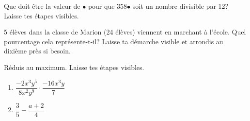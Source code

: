 \documentclass[12pt,parskip=half-, twoside=semi]{scrartcl}
\begin{document}
\begin{exercise}[points=3]
	Que doit être la valeur de $\bullet$ pour que 358$\bullet$ soit un nombre divisible par 12? Laisse tes étapes visibles.
\end{exercise}

\begin{exercise}[points=2]
	5 élèves dans la classe de Marion (24 élèves) viennent en marchant à l'école. Quel pourcentage cela représente-t-il? Laisse ta démarche visible et arrondis au dixième près si besoin.
\end{exercise}

\begin{exercise}[points=2]
    Réduis au maximum. Laisse tes étapes visibles.
    \begin{enumerate}[cols=2]
        \item $\dfrac{-2x^3y^5}{8x^2y^9} \cdot \dfrac{-16x^3y}{7}$
        \item $\dfrac{3}{5} - \dfrac{a+2}{4}$
    \end{enumerate}
\end{exercise}
\end{document}

